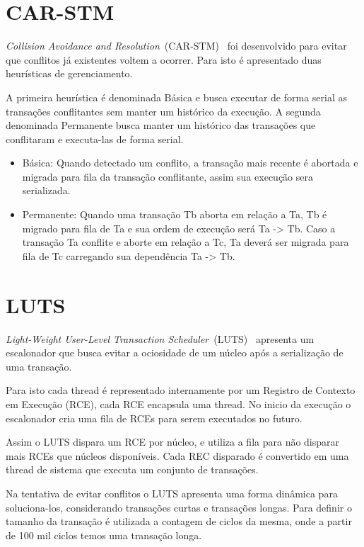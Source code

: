 \documentclass[diss,capa]{texufpel}
\begin{document}
\section{CAR-STM}

\emph{Collision Avoidance and Resolution}~(CAR-STM)~\cite{carstm2008} foi desenvolvido para evitar que conflitos já existentes voltem a ocorrer. Para isto é apresentado duas heurísticas de gerenciamento.

A primeira heurística é denominada Básica e busca executar de forma serial as transações conflitantes sem manter um histórico da execução. A segunda denominada Permanente busca manter um histórico das transações que conflitaram e executa-las de forma serial.

\begin{itemize}
  \item Básica: Quando detectado um conflito, a transação mais recente é abortada e migrada para fila da transação conflitante, assim sua execução sera serializada.
  \item Permanente: Quando uma transação Tb aborta em relação a Ta, Tb é migrado para fila de Ta e sua ordem de execução será Ta -> Tb. Caso a transação Ta conflite e aborte em relação a Tc, Ta deverá ser migrada para fila de Tc carregando sua dependência Ta -> Tb.
\end{itemize}

\section{LUTS}

\emph{Light-Weight User-Level Transaction Scheduler}~(LUTS)~\cite{Nicacio2012} apresenta um escalonador que busca evitar a ociosidade de um núcleo após a serialização de uma transação. 

Para isto cada thread é representado internamente por um Registro de Contexto em Execução (RCE), cada RCE encapsula uma thread. No inicio da execução o escalonador cria uma fila de RCEs para serem executados no futuro.

Assim o LUTS dispara um RCE por núcleo, e utiliza a fila para não disparar mais RCEs que núcleos disponíveis. Cada REC disparado é convertido em uma thread de sistema que executa um conjunto de transações.

Na tentativa de evitar conflitos o LUTS apresenta uma forma dinâmica para soluciona-los, considerando transações curtas e transações longas. Para definir o tamanho da transação é utilizada a contagem de ciclos da mesma, onde a partir de 100 mil ciclos temos uma transação longa.
\end{document}

